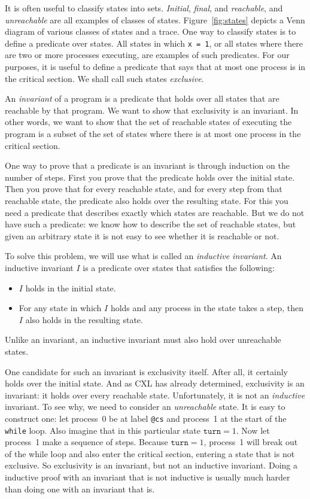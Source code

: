 \documentclass{report}
\begin{document}
It is often useful to classify states into sets.
\emph{Initial}, \emph{final}, and \emph{reachable}, and \emph{unreachable}
are all examples of classes of states.
Figure~\ref{fig:states} depicts a Venn diagram of various classes of states
and a trace.
One way to classify states is to define a predicate over states.
All states in which \texttt{x = 1}, or all states where
there are two or more processes executing, are examples of such predicates.
For our purposes, it is useful to define a predicate that says that at
most one process is in the critical section.  We shall call such states
\emph{exclusive}.

An \emph{invariant} of a program
is a predicate that holds over all states that are reachable by that program.
We want to show that exclusivity is an invariant.
In other words, we want to show that the set of reachable states of executing
the program
is a subset of the set of states where there is at most one process in the critical
section.

One way to prove that a predicate is an invariant is through induction
on the number of steps.  First you prove that the predicate holds over
the initial state.  Then you prove that for every reachable state,
and for every step from that reachable state, the predicate also holds
over the resulting state.
For this you need a predicate that describes exactly which
states are reachable.
But we do not have such a predicate: we know how to describe the set
of reachable states, but given an arbitrary state it is not easy to
see whether it is reachable or not.

To solve this problem, we will use what is called an
\emph{inductive invariant}.
An inductive invariant $I$ is a predicate over states that satisfies the following:
\begin{itemize}
\item $I$ holds in the initial state.
\item For any state in which $I$ holds and any process in the
state takes a step, then $I$ also holds in the resulting state.
\end{itemize}
Unlike an invariant, an inductive invariant must also hold over unreachable states.

One candidate for such an invariant is exclusivity itself.
After all, it certainly holds over the initial state.
And as CXL has already determined, exclusivity is an invariant:
it holds over every reachable state.
Unfortunately, it is not an \emph{inductive} invariant.
To see why, we need to consider an \emph{unreachable} state.
It is easy to construct one: let process~0 be at label \texttt{@cs}
and process~1 at the start of the \texttt{while} loop.
Also imagine that in this particular state $\mathtt{turn} = 1$.  Now let
process~1 make a sequence of steps.  Because $\mathtt{turn} = 1$,
process~1 will break out of the while loop and also enter the critical
section, entering a state that is not exclusive.
So exclusivity is an invariant, but not an inductive invariant.
Doing a inductive proof with an invariant that is not inductive is usually
much harder than doing one with an invariant that is.
\end{document}
